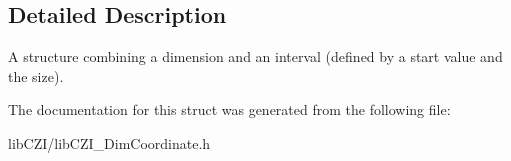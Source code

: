 \subsection{Detailed Description}
A structure combining a dimension and an interval (defined by a start value and the size). 

The documentation for this struct was generated from the following file\+:\begin{DoxyCompactItemize}
\item 
lib\+C\+Z\+I/lib\+C\+Z\+I\+\_\+\+Dim\+Coordinate.\+h\end{DoxyCompactItemize}

